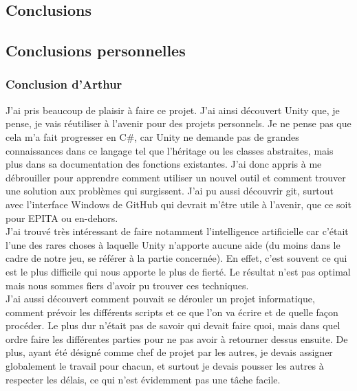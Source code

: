\documentclass[12pt, titlepage]{article}
\begin{document}
\begin{spacing}{1.5}
\newpage
\section*{Conclusions}

\subsection{Conclusions personnelles}

\subsubsection{Conclusion d'Arthur}

J'ai pris beaucoup de plaisir à faire ce projet. J'ai ainsi découvert Unity que, je pense, je vais réutiliser à l'avenir pour des projets personnels. Je ne pense pas que cela m'a fait progresser en C\#, car Unity ne demande pas de grandes connaissances dans ce langage tel que l'héritage ou les classes abstraites, mais plus dans sa documentation des fonctions existantes. J'ai donc appris à me débrouiller pour apprendre comment utiliser un nouvel outil et comment trouver une solution aux problèmes qui surgissent. J'ai pu aussi découvrir git, surtout avec l'interface Windows de GitHub qui devrait m'être utile à l'avenir, que ce soit pour EPITA ou en-dehors.\\

J'ai trouvé très intéressant de faire notamment l'intelligence artificielle car c'était l'une des rares choses à laquelle Unity n'apporte aucune aide (du moins dans le cadre de notre jeu, se référer à la partie concernée). En effet, c'est souvent ce qui est le plus difficile qui nous apporte le plus de fierté. Le résultat n'est pas optimal mais nous sommes fiers d'avoir pu trouver ces techniques.\\

J'ai aussi découvert comment pouvait se dérouler un projet informatique, comment prévoir les différents scripts et ce que l'on va écrire et de quelle façon procéder. Le plus dur n'était pas de savoir qui devait faire quoi, mais dans quel ordre faire les différentes parties pour ne pas avoir à retourner dessus ensuite. De plus, ayant été désigné comme chef de projet par les autres, je devais assigner globalement le travail pour chacun, et surtout je devais pousser les autres à respecter les délais, ce qui n'est évidemment pas une tâche facile.\\


\end{spacing}
\end{document}
